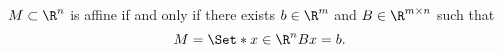 
\begin{prop}
$M \subset \R^{n}$ is affine if and only if there exists
$b \in \R^m$ and $B \in \R^{m \times n}$ such that
$$
  M = \Set*{x \in \R^{n}}{Bx = b}.
$$
\end{prop}
